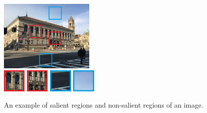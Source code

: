 \begin{figure}[htbp]
\includegraphics[width=0.41\textwidth]{img/library}
\\[0.1cm]
\includegraphics[width=0.1\textwidth]{img/library_1}
\includegraphics[width=0.1\textwidth]{img/library_2}
\includegraphics[width=0.1\textwidth]{img/library_3}
\includegraphics[width=0.1\textwidth]{img/library_4}
\caption{An example of salient regions and non-salient regions of an image.}
\label{fig:library}
\end{figure}


